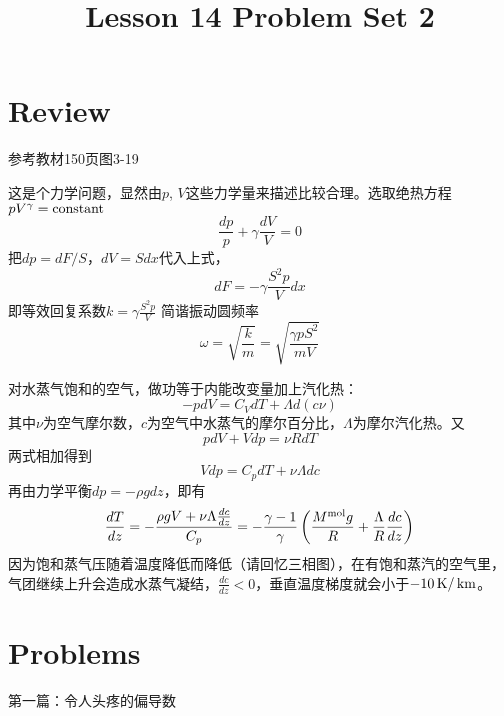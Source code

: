 \documentclass[CJK]{beamer}
\title{Lesson 14 Problem Set 2}
\author{}
\date{}
\begin{document}

\section{Review}


\begin{frame}
\bch
参考教材150页图3-19

这是个力学问题，显然由$p$, $V$这些力学量来描述比较合理。选取绝热方程$pV^\gamma = \mathrm{constant}$
$$ \frac{dp}{p} + \gamma \frac{dV}{V} = 0$$
把$dp = dF/S$，$dV = S dx$代入上式，
$$ dF = -\gamma \frac{S^2p}{V} dx $$
即等效回复系数$k =\gamma \frac{S^2p}{V} $ 简谐振动圆频率
$$\omega = \sqrt{\frac{k}{m}} = \sqrt{\frac{\gamma p S^2}{mV}}$$
\ech
\end{frame}

\begin{frame}
\bch
{\small
对水蒸气饱和的空气，做功等于内能改变量加上汽化热：
$$ -pdV = C_V dT + \Lambda d(c\nu) $$
其中$\nu$为空气摩尔数，$c$为空气中水蒸气的摩尔百分比，$\Lambda$为摩尔汽化热。又
$$pdV + Vdp = \nu R dT$$
两式相加得到
$$ Vdp = C_p  dT + \nu \Lambda dc $$
再由力学平衡$ dp = -\rho g dz$，即有
$$ \frac{dT}{dz} =-\frac{\rho g V + \nu\Lambda\frac{dc}{dz}}{C_p} = -\frac{\gamma-1}{\gamma}\left(\frac{M^{\rm mol}g}{R}+\frac{\Lambda}{R}\frac{dc}{dz}\right)$$
因为饱和蒸气压随着温度降低而降低（请回忆三相图），在有饱和蒸汽的空气里，气团继续上升会造成水蒸气凝结，$ \frac{dc}{dz} < 0 $，垂直温度梯度就会小于$-10\,\mathrm{K}/\,\mathrm{km}$。
}
\ech
\end{frame}

\section{Problems}

\begin{frame}
  \bch
  第一篇：令人头疼的偏导数
  \ech
\end{frame}


\begin{frame}
  \bch
  {\blue }
  \ech
\end{frame}

\begin{frame}
  \chtitle{}
  \bch
  \ech
\end{frame}

\begin{frame}
  \chtitle{}
  \bch
  \ech
\end{frame}
\end{document}
